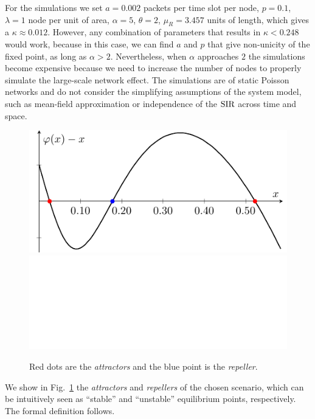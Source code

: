 For the simulations we set $a = 0.002$ packets per time slot per node, $p = 0.1$, $\lambda = 1$ node per unit of area, ${\alpha = 5}$, $\theta = 2$, $\mu_R = 3.457$ units of length, which gives a $\kappa \approx 0.012$.
%
{However, any combination of parameters that results in $\kappa < 0.248$ would work, because in this case, we can find $a$ and $p$ that give non-unicity of the fixed point, as long as $\alpha>2$.
%
Nevertheless, when $\alpha$ approaches $2$ the simulations become expensive because we need to increase the number of nodes to properly simulate the large-scale network effect.}
%
The simulations are of static Poisson networks and do not consider the simplifying assumptions of the system model, such as mean-field approximation or independence of the $\mathrm{SIR}$ across time and space.

\begin{figure}[ht]
    \centering
    \if{}
        \includegraphics[]{Figures/Ch8_fixed_point.pdf}
    \else
        \includegraphics[draft,width=\textwidth]{Figures/placeholder.png}
    \fi
    \caption{Red dots are the \textit{attractors} and the blue point is the \textit{repeller}.}
    \label{fig:fixed_point}
\end{figure}

We show in Fig.~\ref{fig:fixed_point} the \textit{attractors} and \textit{repellers}
of the chosen scenario, which can be intuitively seen as ``stable'' and ``unstable'' equilibrium points, respectively.
%
The formal definition follows.

